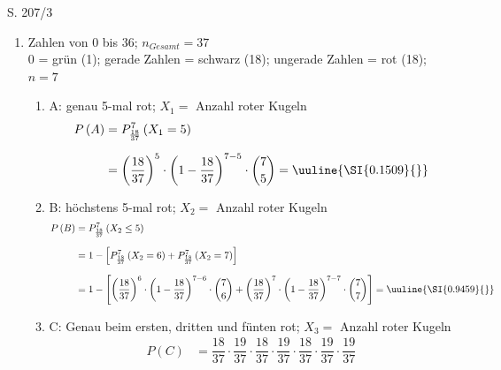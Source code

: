 \begin{Exercise}{S. 207/3}{}
\begin{enumerate}[leftmargin=*]
    \item [3.]{
        Zahlen von 0 bis 36; \quad $n_{Gesamt} = 37$\\[1.0ex]
        0 = grün (1); \quad gerade Zahlen = schwarz (18); \quad ungerade Zahlen = rot (18); \quad $n = 7$\\[-1.0ex]
        \begin{enumerate}[label=\alph*),leftmargin=*]
            \item[a1)] {
                A: genau 5-mal rot; \qquad $X_{1} =$ Anzahl roter Kugeln\\[-1.0ex]
                \begin{align*}
                    P\left(A\right) &= P_{\frac{18}{37}}^{7}\left(X_{1} = 5\right)\\[1.5ex]
                    &= \left(\dfrac{18}{37}\right)^{5} \cdot \left(1 - \dfrac{18}{37}\right)^{7-5} \cdot \binom{7}{5} = \uuline{\SI{0.1509}{}}
                \end{align*}
                }
            \item[a2)] {
                B: höchstens 5-mal rot; \qquad $X_{2} =$ Anzahl roter Kugeln\\[-1.0ex]
                \begin{align*}
                    P\left(B\right) &= P_{\frac{18}{37}}^{7}\left(X_{2} \leq 5\right)\\[1.5ex]
                    &= 1 - \left[P_{\frac{18}{37}}^{7}\left(X_{2} = 6\right) + P_{\frac{18}{37}}^{7}\left(X_{2} = 7\right)\right]\\[1.5ex]
                    &= 1 - \left[\left(\dfrac{18}{37}\right)^{6} \cdot \left(1 - \dfrac{18}{37}\right)^{7-6} \cdot \binom{7}{6} + \left(\dfrac{18}{37}\right)^{7} \cdot \left(1 - \dfrac{18}{37}\right)^{7-7} \cdot \binom{7}{7}\right] = \uuline{\SI{0.9459}{}}
                \end{align*}
                }
            \item[a3)] {
                C: Genau beim ersten, dritten und fünten rot; \qquad $X_{3} =$ Anzahl roter Kugeln\\[-1.0ex]
                \begin{align*}
                    P\left(C\right) &= \dfrac{18}{37} \cdot \dfrac{19}{37} \cdot \dfrac{18}{37} \cdot \dfrac{19}{37} \cdot \dfrac{18}{37} \cdot \dfrac{19}{37} \cdot \dfrac{19}{37}\\[1.5ex]

\end{align*}}
\end{enumerate}}
\end{enumerate}
\end{Exercise}
